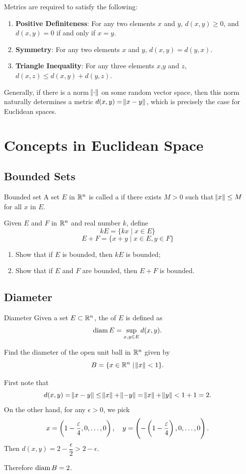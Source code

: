 Metrics are required to satisfy the following:
\begin{enumerate}
\item \textbf{Positive Definiteness}: For any two elements $x$ and $y$, $d(x,y)\ge0$, and $d(x,y)=0$ if and only if $x=y$.
\item \textbf{Symmetry}: For any two elements $x$ and $y$, $d(x,y)=d(y,x)$.
\item \textbf{Triangle Inequality}: For any three elements $x$,$y$ and $z$, $d(x,z) \le d(x,y)+d(y,z)$.
\end{enumerate}

Generally, if there is a norm $\norm{\cdot}$ on some random vector space, then this norm naturally determines a metric $d(x,y)=\norm{x-y}$, which is precisely the case for Euclidean spaces.

\section{Concepts in Euclidean Space}
\subsection{Bounded Sets}
\begin{defn}{Bounded set}{}
A set $E$ in $\mathbb R^n$ is called a  if there exists $M>0$ such that $\norm{x}\le M$ for all $x$ in $E$.
\end{defn}

\begin{exmp}{}{}
Given $E$ and $F$ in $\mathbb R^n$ and real number $k$, define
\[ kE=\{kx \mid x\in E\} \]
\[ E+F=\{x+y \mid x\in E,y\in F\} \]
\begin{enumerate}[label=(\alph*)]
\item Show that if $E$ is bounded, then $kE$ is bounded;
\item Show that if $E$ and $F$ are bounded, then $E+F$ is bounded.
\end{enumerate}
\end{exmp}

\subsection{Diameter}
\begin{defn}{Diameter}{}
Given a set $E\subset\mathbb R^n$, the  of $E$ is defined as
\[ \operatorname{diam} E=\sup_{x,y\in E}d(x,y). \]
\end{defn}

\begin{exmp}{}{}
Find the diameter of the open unit ball in $\mathbb R^n$ given by
\[ B=\{x\in\mathbb R^n \mid \norm{x}<1\}. \]
\end{exmp}
\begin{solution}
First note that
\[ d(x,y)=\norm{x-y}\le\norm{x}+\norm{-y}=\norm{x}+\norm{y}<1+1=2. \]
On the other hand, for any $\epsilon>0$, we pick
\[ x=\left(1-\frac{\varepsilon}{4},0,\dots,0\right), \quad y=\left(-\left(1-\frac{\varepsilon}{4}\right),0,\dots,0\right). \]
Then $d(x,y)=2-\dfrac{\epsilon}{2}>2-\epsilon$.

Therefore $\operatorname{diam} B = 2$.
\end{solution}


